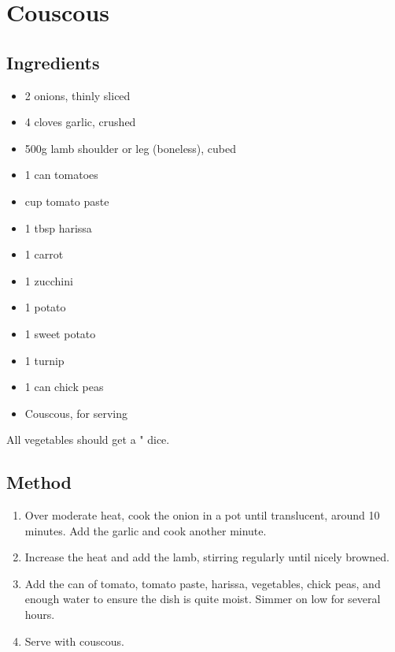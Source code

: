 \section{Couscous}



\subsection{Ingredients}

\begin{itemize}
	\item 2 onions, thinly sliced
	\item 4 cloves garlic, crushed
	\item 500g lamb shoulder or leg (boneless), cubed
	\item 1 can tomatoes
	\item {} cup tomato paste
	\item 1 tbsp harissa
	\item 1 carrot
	\item 1 zucchini
	\item 1 potato
	\item 1 sweet potato
	\item 1 turnip
	\item 1 can chick peas
	\item Couscous, for serving
\end{itemize}

All vegetables should get a " dice.

\subsection{Method}

\begin{enumerate}
	\item Over moderate heat, cook the onion in a pot until translucent, around 10 minutes. Add the garlic and cook another minute.
	\item Increase the heat and add the lamb, stirring regularly until nicely browned.
	\item Add the can of tomato, tomato paste, harissa, vegetables, chick peas, and enough water to ensure the dish is quite moist. Simmer on low for several hours.
	\item Serve with couscous.
\end{enumerate}
